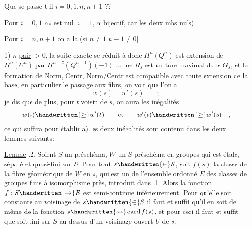 Que se passe-t-il  $i=0,1,n,n+1$ ??

Pour $i=0,1$ $\alpha_*$ est \uline{nul} [$i=1$,  $\alpha$ bijectif, car les deux mbs nuls)

Pour $i=n,n+1$ on a la   (si $\boxed{n\ne1}$  $n-1\ne0$]

1) $n$ \uline{pair} $>0$, la suite exacte se réduit à
donc $H^n(Q^n)$ est extension de $H^n(U^n)$ par $H^{n-2}(Q^{n-1})(-1)$ ...
me $R_s$ est un tore maximal dans $G_s$, et la formation de \uline{Norm}, \uline{Centr}, \uline{Norm}/\uline{Centr} est compatible avec toute extension de la base, en particulier le passage aux fibrs, on voit que l'on a
\[
w(s)=w'(s)\qquad ;
\]
je dis que de plus, pour $t$ voisin de $s$, on aura les inégalités
\[
w(t)\handwritten{\geq}w'(t)\qquad\text{et}\qquad w'(t)\handwritten{\geq}w'(s)\quad ,
\]
ce qui suffira pour établir a).  es deux inégalités  sont contenu dans les deux lemmes suivants:

\uline{Lemme} .2. Soient $S$ un préschéma, $W$ un $S$-préschéma en groupes qui est étale,  séparé et quasi-fini sur $S$. Pour tout $s\handwritten{\in}S$, soit $f(s)$ la classe de la fibre géométrique de $W$ en $s$, qui est un  de l'ensemble ordonné $E$ des classes de groupes finis à isomorphisme près, introduit dans .1. Alors la fonction $f:S\handwritten{\to}E$ est semi-continue inférieurement. Pour qu'elle soit constante au voisinage de $s\handwritten{\in}S$\handwritten{,}  il faut et suffit qu'il en soit de même de la fonction $s\handwritten{\rightsquigarrow}\operatorname{card}f(s)$, et pour ceci il faut et suffit que  soit fini sur $S$ au dessus d'un voisinage ouvert $U$ de $s$.

